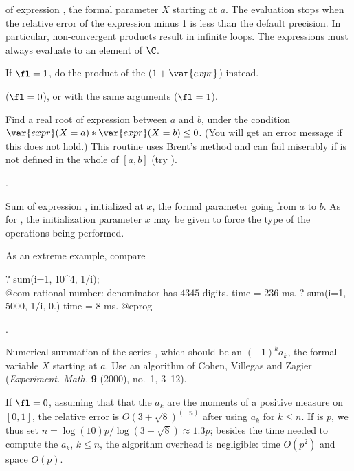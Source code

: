 \label{se:prodinf}
 of
expression , the formal parameter $X$ starting at $a$. The evaluation
stops when the relative error of the expression minus 1 is less than the
default precision. In particular, non-convergent products result in infinite
loops. The expressions must always evaluate to an element of $\C$.

If $\fl=1$, do the product of the ($1+\var{expr}$) instead.

($\fl=0$), or  with the same arguments ($\fl=1$).

\label{se:solve}
Find a real root of expression
 between $a$ and $b$, under the condition
$\var{expr}(X=a) * \var{expr}(X=b) \le 0$. (You will get an error message
 if this does not hold.)
This routine uses Brent's method and can fail miserably if  is
not defined in the whole of $[a,b]$ (try ).

.

\label{se:sum}
Sum of expression ,
initialized at $x$, the formal parameter going from $a$ to $b$. As for
, the initialization parameter $x$ may be given to force the type
of the operations being performed.

\noindent As an extreme example, compare

\bprog
? sum(i=1, 10^4, 1/i); \\@com rational number: denominator has $4345$ digits.
time = 236 ms.
? sum(i=1, 5000, 1/i, 0.)
time = 8 ms.
@eprog

.

\label{se:sumalt}
Numerical summation of the series , which should be an
 $(-1)^k a_k$, the formal variable $X$ starting at
$a$. Use an algorithm of Cohen, Villegas and Zagier (\emph{Experiment. Math.}
{\bf 9} (2000), no.~1, 3--12).

If $\fl=0$, assuming that that the $a_k$ are the moments of a positive
measure on $[0,1]$, the relative error is $O(3+\sqrt8)^(-n)$ after using
$a_k$ for $k\leq n$. If  is $p$, we thus set
$n = \log(10)p/\log(3+\sqrt8)\approx 1.3 p$; besides the time needed to
compute the $a_k$, $k\leq n$, the algorithm overhead is negligible: time
$O(p^2)$ and space $O(p)$.

